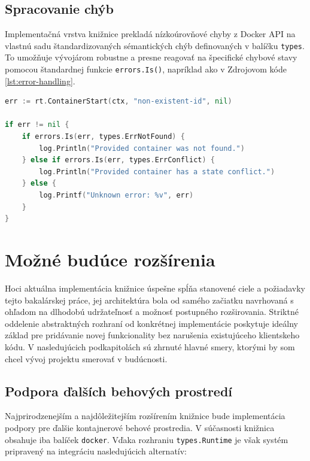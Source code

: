 \documentclass[
 program=infpvs,
  language=slovak,
  figures=false,
  tables=false,
  sourcecodes,
  glossaries,
  index
]{kidiplom}
\begin{document}
{\subsection{Spracovanie chýb}  \label{sec:docs-chyby}
Implementačná vrstva knižnice prekladá nízkoúrovňové chyby z Docker API na vlastnú sadu štandardizovaných sémantických chýb definovaných v balíčku \texttt{types}. To umožňuje vývojárom robustne a presne reagovať na špecifické chybové stavy pomocou štandardnej funkcie \texttt{errors.Is()}, napríklad ako v Zdrojovom kóde \ref{lst:error-handling}.

\begin{lstlisting}[language=Go, caption={Ukážka spracovania chýb.}, label={lst:error-handling}]
err := rt.ContainerStart(ctx, "non-existent-id", nil)

if err != nil {
    if errors.Is(err, types.ErrNotFound) {
        log.Println("Provided container was not found.")
    } else if errors.Is(err, types.ErrConflict) {
        log.Println("Provided container has a state conflict.")
    } else {
        log.Printf("Unknown error: %v", err)
    }
}
\end{lstlisting}



\section{Možné budúce rozšírenia}  \label{sec:buduce-rozsirenia}
Hoci aktuálna implementácia knižnice úspešne spĺňa stanovené ciele a požiadavky tejto bakalárskej práce, jej architektúra bola od samého začiatku navrhovaná s ohľadom na dlhodobú udržateľnosť a možnosť postupného rozširovania. Striktné oddelenie abstraktných rozhraní od konkrétnej implementácie poskytuje ideálny základ pre pridávanie novej funkcionality bez narušenia existujúceho klientskeho kódu. V nasledujúcich podkapitolách sú zhrnuté hlavné smery, ktorými by som chcel vývoj projektu smerovať v budúcnosti.



\subsection{Podpora ďalších behových prostredí}  \label{sec:dalsie-runtimes}
Najprirodzenejším a najdôležitejším rozšírením knižnice bude implementácia podpory pre ďalšie kontajnerové behové prostredia. V súčasnosti knižnica obsahuje iba balíček \texttt{docker}. Vďaka rozhraniu \texttt{types.Runtime} je však systém pripravený na integráciu nasledujúcich alternatív:

}
\end{document}
